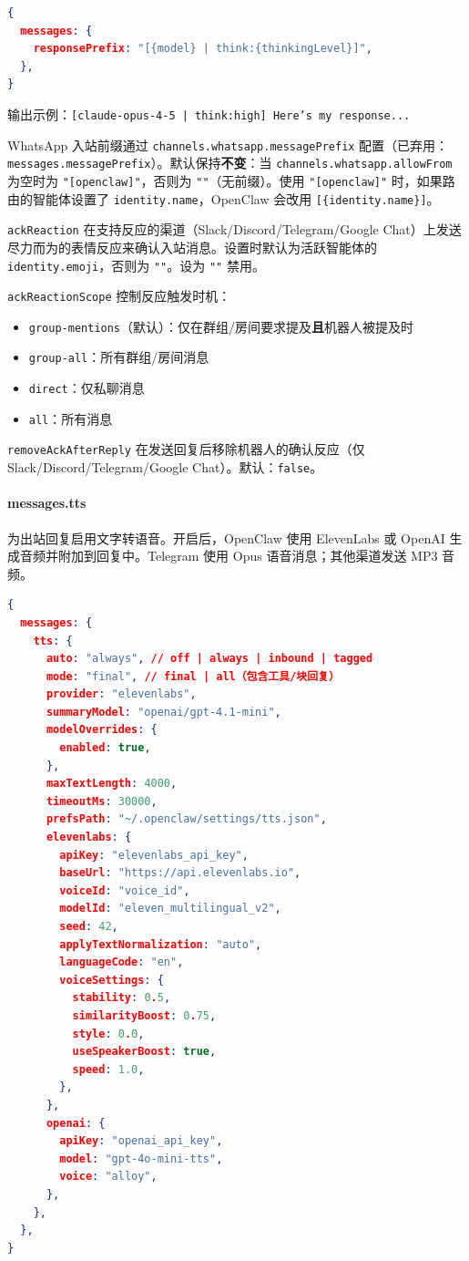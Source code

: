 \begin{lstlisting}[language=json]
{
  messages: {
    responsePrefix: "[{model} | think:{thinkingLevel}]",
  },
}
\end{lstlisting}


输出示例：\texttt{[claude-opus-4-5 | think:high] Here's my response...}

WhatsApp 入站前缀通过 \texttt{channels.whatsapp.messagePrefix} 配置（已弃用：\texttt{messages.messagePrefix}）。默认保持\textbf{不变}：当 \texttt{channels.whatsapp.allowFrom} 为空时为 \texttt{"[openclaw]"}，否则为 \texttt{""}（无前缀）。使用 \texttt{"[openclaw]"} 时，如果路由的智能体设置了 \texttt{identity.name}，OpenClaw 会改用 \texttt{[\{identity.name\}]}。

\texttt{ackReaction} 在支持反应的渠道（Slack/Discord/Telegram/Google Chat）上发送尽力而为的表情反应来确认入站消息。设置时默认为活跃智能体的 \texttt{identity.emoji}，否则为 \texttt{""}。设为 \texttt{""} 禁用。

\texttt{ackReactionScope} 控制反应触发时机：

\begin{itemize}
  \item \texttt{group-mentions}（默认）：仅在群组/房间要求提及\textbf{且}机器人被提及时
  \item \texttt{group-all}：所有群组/房间消息
  \item \texttt{direct}：仅私聊消息
  \item \texttt{all}：所有消息
\end{itemize}


\texttt{removeAckAfterReply} 在发送回复后移除机器人的确认反应（仅 Slack/Discord/Telegram/Google Chat）。默认：\texttt{false}。

\paragraph{messages.tts}


为出站回复启用文字转语音。开启后，OpenClaw 使用 ElevenLabs 或 OpenAI 生成音频并附加到回复中。Telegram 使用 Opus 语音消息；其他渠道发送 MP3 音频。

\begin{lstlisting}[language=json]
{
  messages: {
    tts: {
      auto: "always", // off | always | inbound | tagged
      mode: "final", // final | all（包含工具/块回复）
      provider: "elevenlabs",
      summaryModel: "openai/gpt-4.1-mini",
      modelOverrides: {
        enabled: true,
      },
      maxTextLength: 4000,
      timeoutMs: 30000,
      prefsPath: "~/.openclaw/settings/tts.json",
      elevenlabs: {
        apiKey: "elevenlabs_api_key",
        baseUrl: "https://api.elevenlabs.io",
        voiceId: "voice_id",
        modelId: "eleven_multilingual_v2",
        seed: 42,
        applyTextNormalization: "auto",
        languageCode: "en",
        voiceSettings: {
          stability: 0.5,
          similarityBoost: 0.75,
          style: 0.0,
          useSpeakerBoost: true,
          speed: 1.0,
        },
      },
      openai: {
        apiKey: "openai_api_key",
        model: "gpt-4o-mini-tts",
        voice: "alloy",
      },
    },
  },
}
\end{lstlisting}


